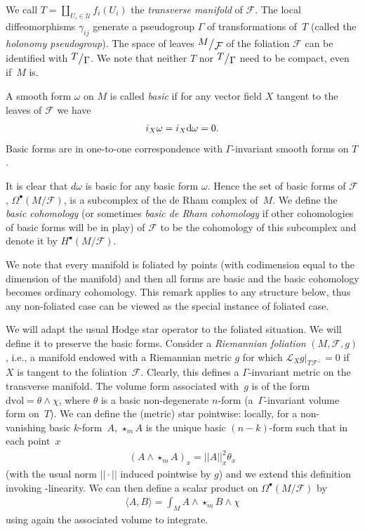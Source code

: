 \documentclass[pdftex]{sigma}
\numberwithin{equation}{section}
\newcommand{\bigslant}[2]{{\raisebox{.2em}{$#1$}\big/\raisebox{-.2em}{$#2$}}}
\begin{document}
We call $T=\coprod\limits_{U_i\in\mathcal{U}}f_i(U_i)$ the \emph{transverse manifold} of $\mathcal{F}$. The local diffeomorphisms $\gamma_{ij}$ generate a pseudogroup $\Gamma$ of transformations of~$T$ (called the \emph{holonomy pseudogroup}). The space of leaves $\bigslant{M}{\mathcal{F}}$ of the foliation $\mathcal{F}$ can be identified with $\bigslant{T}{\Gamma}$. We note that neither $T$ nor $\bigslant{T}{\Gamma}$ need to be compact, even if~$M$ is.
\begin{Definition}
A smooth form $\omega$ on $M$ is called \emph{basic} if for any vector field $X$ tangent to the leaves of $\mathcal{F}$ we have
\begin{gather*}
i_X\omega= i_X{\rm d}\omega= 0.
\end{gather*}
Basic forms are in one-to-one correspondence with $\Gamma$-invariant smooth forms on $T$.
\end{Definition}

It is clear that $d\omega$ is basic for any basic form $\omega$. Hence the set of basic forms of $\mathcal{F}$, $\Omega^{\bullet}(M\slash\mathcal{F})$, is a subcomplex of the de Rham complex of~$M$. We define the \emph{basic cohomology} (or sometimes \emph{basic de Rham cohomology} if other cohomologies of basic forms will be in play) of $\mathcal{F}$ to be the cohomology of this subcomplex and denote it by $H^{\bullet}(M\slash\mathcal{F})$.

We note that every manifold is foliated by points (with codimension equal to the dimension of the manifold) and then all forms are basic and the basic cohomology becomes ordinary cohomology. This remark applies to any structure below, thus any non-foliated case can be viewed as the special instance of foliated case.

We will adapt the usual Hodge star operator to the foliated situation. We will define it to preserve the basic forms. Consider a \emph{Riemannian foliation} $(M,\mathcal{F},g)$, i.e., a manifold endowed with a Riemannian metric $g$ for which $\mathcal{L}_Xg|_{T\mathcal{F}^{\bot}}=0$ if $X$ is tangent to the foliation~$\mathcal{F}$. Clearly, this defines a $\Gamma$-invariant metric on the transverse manifold. The volume form associated with~$g$ is of the form $\text{dvol} =\theta\wedge \chi$, where $\theta$ is a basic non-degenerate $n$-form (a~$\Gamma$-invariant volume form on~$T$). We can define the (metric) star pointwise: locally, for a non-vanishing basic $k$-form~$A$, $\star_{m} A$ is the unique basic $(n-k)$-form such that in each point~$x$
\begin{gather*}
(A\wedge\star_{m} A)_x=||A||^2_x\theta_x
\end{gather*}
(with the usual norm $||\cdot||$ induced pointwise by $g$) and we extend this definition invoking -linearity. We can then define a scalar product on $\Omega^{\bullet}(M\slash\mathcal{F})$ by
\begin{gather*}
\langle A,B\rangle = \int_{M} A\wedge \star_{m} B\wedge \chi
\end{gather*}
using again the associated volume to integrate.
\end{document}

